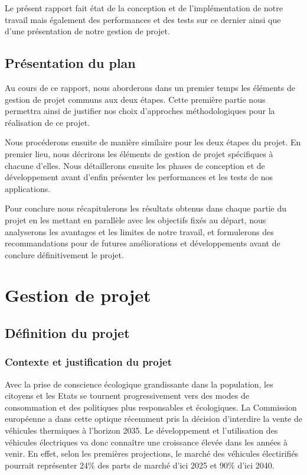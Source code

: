 \documentclass[a4paper, 12pt]{report}
\begin{document}
\bigskip
Le présent rapport fait état de la conception et de l'implémentation de notre travail mais également des performances et des tests sur ce dernier ainsi que d'une présentation de notre gestion de projet.

    \section{Présentation du plan}

Au cours de ce rapport, nous aborderons dans un premier temps les éléments de gestion de projet communs aux deux étapes. Cette première partie nous permettra ainsi de justifier nos choix d'approches méthodologiques pour la réalisation de ce projet.
\bigskip

Nous procéderons ensuite de manière similaire pour les deux étapes du projet. En premier lieu, nous décrirons les éléments de gestion de projet spécifiques à chacune d'elles. Nous détaillerons ensuite les phases de conception et de développement avant d'enfin présenter les performances et les tests de nos applications.
\bigskip


Pour conclure nous récapitulerons les résultats obtenus dans chaque partie du projet en les mettant en parallèle avec les objectifs fixés au départ, nous analyserons les avantages et les limites de notre travail, et formulerons des recommandations pour de futures améliorations et développements avant de conclure définitivement le projet.


\chapter{Gestion de projet}
\minitoc
{}
\clearpage
    \section{Définition du projet}
        
    \subsection{Contexte et justification du projet}

Avec la prise de conscience écologique grandissante dans la population, les citoyens et les Etats se tournent progressivement vers des modes de consommation et des politiques plus responsables et écologiques. La Commission européenne a dans cette optique récemment pris la décision d'interdire la vente de véhicules thermiques à l'horizon 2035. Le développement et l'utilisation des véhicules électriques va donc connaître une croissance élevée dans les années à venir. En effet, selon les premières projections\footnotemark[1], le marché des véhicules électirifiés pourrait représenter 24\% des parts de marché d'ici 2025 et 90\% d'ici 2040. 
\bigskip
{}
\end{document}
